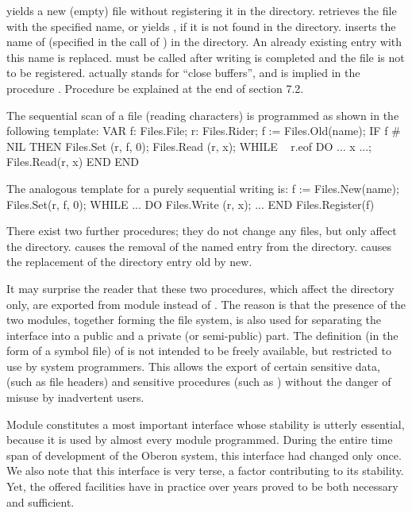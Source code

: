 \noindent {} yields a new (empty) file without registering it in the directory.  retrieves the file with the specified name, or yields , if it is not found in the directory.  inserts the name of  (specified in the call of ) in the directory. An already existing entry with this name is replaced.  must be called after writing is completed and the file is not to be registered.  actually stands for ``close buffers'', and is implied in the procedure . Procedure  be explained at the end of section 7.2.

The sequential scan of a file  (reading characters) is programmed as shown in the following template:
\begintt
VAR f: Files.File;
    r: Files.Rider;
f := Files.Old(name);
IF f # NIL THEN
  Files.Set (r, f, 0);
  Files.Read (r, x);
  WHILE ~ r.eof DO
    ... x ...;
    Files.Read(r, x)
  END
END
\endtt

\noindent The analogous template for a purely sequential writing is:
\begintt
f := Files.New(name);
Files.Set(r, f, 0);
WHILE ... DO Files.Write (r, x); ... END
Files.Register(f)
\endtt

There exist two further procedures; they do not change any files, but only affect the directory.  causes the removal of the named entry from the directory.  causes the replacement of the directory entry old by new.

It may surprise the reader that these two procedures, which affect the directory only, are exported from module  instead of . The reason is that the presence of the two modules, together forming the file system, is also used for separating the interface into a public and a private (or semi-public) part. The definition (in the form of a symbol file) of  is not intended to be freely available, but restricted to use by system programmers. This allows the export of certain sensitive data, (such as file headers) and sensitive procedures (such as ) without the danger of misuse by inadvertent users.

Module  constitutes a most important interface whose stability is utterly essential, because it is used by almost every module programmed. During the entire time span of development of the Oberon system, this interface had changed only once. We also note that this interface is very terse, a factor contributing to its stability. Yet, the offered facilities have in practice over years proved to be both necessary and sufficient.

